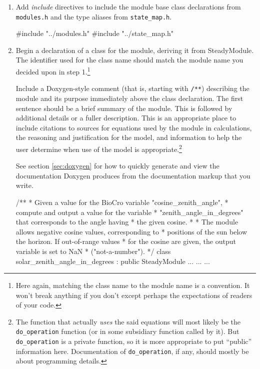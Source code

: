 \documentclass{article}\usepackage[]{graphicx}\usepackage[]{color}
\newcommand{\code}[1]{\lstinline[style=C++style]{#1}}
\begin{document}
\begin{enumerate}
\item Add \emph{include} directives to include the module base class
  declarations from \code{modules.h} and the type aliases from
  \code{state_map.h}.
  \begin{example}[4]
    #include "../modules.h"
    #include "../state_map.h"
  \end{example}

\item Begin a declaration of a class for the module, deriving it from
  SteadyModule.  The identifier used for the class name should match
  the module name you decided upon in step 1.\footnote{Here again,
  matching the class name to the module name is a convention.  It
  won't break anything if you don't except perhaps the expectations of
  readers of your code.}

  Include a Doxygen-style comment (that is, starting with \code{/**})
  describing the module and its purpose immediately above the class
  declaration.  The first sentence should be a brief summary of the
  module.  This is followed by additional details or a fuller
  description.  This is an appropriate place to include citations to
  sources for equations used by the module in calculations, the
  reasoning and justification for the model, and information to help
  the user determine when use of the model is
  appropriate.\footnote{The function that actually \emph{uses} the
  said equations will most likely be the \code{do_operation} function
  (or in some subsidiary function called by it).  But
  \code{do_operation} is a private function, so it is more appropriate
  to put ``public'' information here.  Documentation of
  \code{do_operation}, if any, should mostly be about programming
  details.}

  See section \ref{sec:doxygen} for how to quickly generate and view
  the documentation Doxygen produces from the documentation markup
  that you write.

  \begin{example}[4]
    /**
     *  Given a value for the BioCro variable "cosine_zenith_angle",
     *  compute and output a value for the variable
     *  "zenith_angle_in_degrees" that corresponds to the angle having
     *  the given cosine.
     *
     *  The module allows negative cosine values, corresponding to
     *  positions of the sun below the horizon.  If out-of-range values
     *  for the cosine are given, the output variable is set to NaN
     *  ("not-a-number").
     */
    class solar_zenith_angle_in_degrees : public SteadyModule {
      ...
      ...
      ...
    }
  \end{example}


\end{enumerate}
\end{document}
